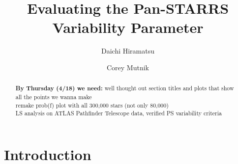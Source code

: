 \documentclass[aps,prb,twocolumn,superscriptaddress]{revtex4-1}
\begin{document}
\title{Evaluating the Pan-STARRS Variability Parameter}


%


\author{Daichi Hiramatsu}
\author{Corey Mutnik}



\begin{abstract}
\textbf{By Thursday (4/18) we need:} well thought out section titles and plots that show all the points we wanna make\\

remake prob(f) plot with all 300,000 stars (not only 80,000)\\

LS analysis on ATLAS Pathfinder Telescope data, verified PS variability criteria
\end{abstract}

\maketitle    




\section{Introduction}

\end{document}
